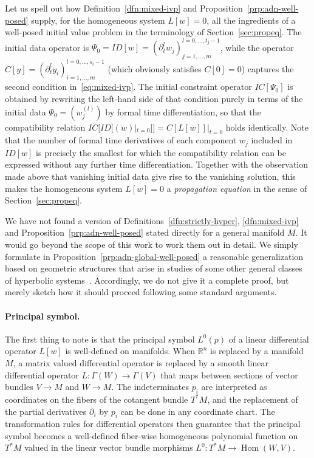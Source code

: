 \documentclass[a4paper]{article}
\theoremstyle{remark}
\newcommand{\del}{\partial}
\newcommand{\Secs}{\Gamma}
\begin{document}
Let us spell out how Definition~\ref{dfn:mixed-ivp} and
Proposition~\ref{prp:adn-well-posed} supply, for the homogeneous system $L[w] =
0$, all the ingredients of a well-posed initial value problem in the
terminology of Section~\ref{sec:propeq}. The initial data operator is $\Psi_0 =
ID[w] = (\del_t^l w_j)_{j=1,\ldots,m}^{l=0,\ldots,t_j-1}$, while the operator
$C[y] = (\del_t^l y_i)_{i=1,\ldots,m}^{l=0,\ldots,s_i-1}$ (which obviously
satisfies $C[0] = 0$) captures the second condition in~\eqref{eq:mixed-ivp}.
The initial constraint operator $IC[\Psi_0]$ is obtained by rewriting the
left-hand side of that condition purely in terms of the initial data $\Psi_0 =
(w_j^{(l)})$ by formal time differentiation, so that the compatibility relation
$IC[ID[(w)|_{t=0}]] = C[L[w]]|_{t=0}$ holds identically. Note that the number
of formal time derivatives of each component $w_j$ included in $ID[w]$ is
precisely the smallest for which the compatibility relation can be expressed
without any further time differentiation. Together with the observation made
above that vanishing initial data give rise to the vanishing solution, this
makes the homogeneous system $L[w] = 0$ a \emph{propagation equation} in the
sense of Section~\ref{sec:propeq}.

We have not found a version of Definitions~\ref{dfn:strictly-hyper},
\ref{dfn:mixed-ivp} and Proposition~\ref{prp:adn-well-posed} stated directly
for a general manifold $M$. It would go beyond the scope of this work to work
them out in detail. We simply formulate in
Proposition~\ref{prp:adn-global-well-posed} a reasonable generalization based
on geometric structures that arise in studies of some other general classes of
hyperbolic systems~\cite{kh-chargeom}. Accordingly, we do not give it a
complete proof, but merely sketch how it should proceed following some standard arguments.

\paragraph{Principal symbol.}
The first thing to note is that the principal symbol $L^0(p)$ of a linear
differential operator $L[w]$ is well-defined on manifolds. When $\mathbb{R}^n$
is replaced by a manifold $M$, a matrix valued differential operator is
replaced by a smooth linear differential operator $L \colon \Secs(W) \to
\Secs(V)$ that maps between sections of vector bundles $V\to M$ and $W\to M$.
The indeterminates $p_i$ are interpreted as coordinates on the fibers of the
cotangent bundle $T^*M$, and the replacement of the partial derivatives
$\del_i$ by $p_i$ can be done in any coordinate chart. The transformation rules
for differential operators then guarantee that the principal symbol becomes a
well-defined fiber-wise homogeneous polynomial function on $T^*M$ valued in the
linear vector bundle morphisms $L^0 \colon T^*M \to \operatorname{Hom}(W,V)$.
\end{document}
